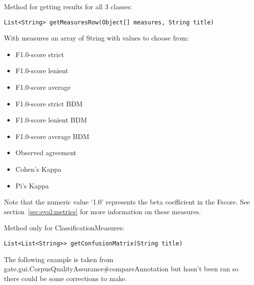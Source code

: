 Method for getting results for all 3 classes:
\begin{small}\begin{verbatim}
List<String> getMeasuresRow(Object[] measures, String title)
\end{verbatim}\end{small}

With measures an array of String with values to choose from:
\begin{itemize}
\item F1.0-score strict
\item F1.0-score lenient
\item F1.0-score average
\item F1.0-score strict BDM
\item F1.0-score lenient BDM
\item F1.0-score average BDM
\item Observed agreement
\item Cohen's Kappa
\item Pi's Kappa
\end{itemize}

Note that the numeric value `1.0' represents the beta coefficient in the Fscore.
See section~\ref{sec:eval:metrics} for more information on these measures.

Method only for ClassificationMeasures:
\begin{small}
\begin{verbatim}
List<List<String>> getConfusionMatrix(String title)
\end{verbatim}\end{small}

The following example is taken from
{gate.gui.CorpusQualityAssurance\#compareAnnotation} but hasn't been ran so
there could be some corrections to make.

